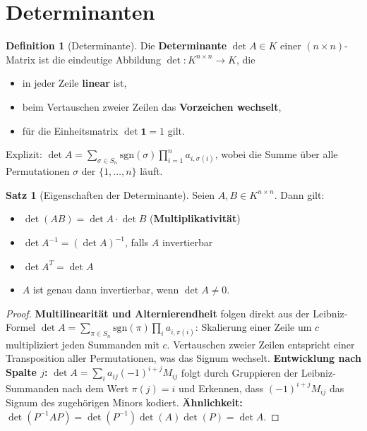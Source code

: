 ﻿\documentclass[a4paper,12pt]{report}
\theoremstyle{definition}
\newtheorem{definition}{Definition}
\newtheorem{satz}{Satz}
\begin{document}
\section{Determinanten}

\begin{definition}[Determinante]
    Die \textbf{Determinante} $\det A \in K$ einer $(n \times n)$-Matrix
    ist die eindeutige Abbildung $\det : K^{n \times n} \to K$, die
    \begin{itemize}
        \item[-] in jeder Zeile \textbf{linear} ist,
        \item[-] beim Vertauschen zweier Zeilen das \textbf{Vorzeichen wechselt},
        \item[-] für die Einheitsmatrix $\det \mathbf{1} = 1$ gilt.
    \end{itemize}
    Explizit: $\det A = \sum_{\sigma \in S_n} \mathrm{sgn}(\sigma) \prod_{i=1}^n a_{i,\sigma(i)}$,
    wobei die Summe über alle Permutationen $\sigma$ der $\{1, \dots, n\}$ läuft.
\end{definition}

\begin{satz}[Eigenschaften der Determinante]
    Seien $A, B \in K^{n \times n}$. Dann gilt:
    \begin{itemize}
        \item[-] $\det(AB) = \det A \cdot \det B$ \quad (\textbf{Multiplikativität})
        \item[-] $\det A^{-1} = (\det A)^{-1}$, falls $A$ invertierbar
        \item[-] $\det A^T = \det A$
        \item[-] $A$ ist genau dann invertierbar, wenn $\det A \neq 0$.
    \end{itemize}
\end{satz}
\begin{proof}
    \textbf{Multilinearität und Alternierendheit} folgen direkt aus der Leibniz-Formel
    $\det A = \sum_{\pi \in S_n} \mathrm{sgn}(\pi) \prod_i a_{i,\pi(i)}$:
    Skalierung einer Zeile um $c$ multipliziert jeden Summanden mit $c$.
    Vertauschen zweier Zeilen entspricht einer Transposition aller Permutationen,
    was das Signum wechselt.
    \textbf{Entwicklung nach Spalte $j$:} $\det A = \sum_i a_{ij} (-1)^{i+j} M_{ij}$
    folgt durch Gruppieren der Leibniz-Summanden nach dem Wert $\pi(j) = i$
    und Erkennen, dass $(-1)^{i+j} M_{ij}$ das Signum des zugehörigen Minors kodiert.
    \textbf{Ähnlichkeit:} $\det(P^{-1}AP) = \det(P^{-1})\det(A)\det(P) = \det A$.
\end{proof}
\end{document}
